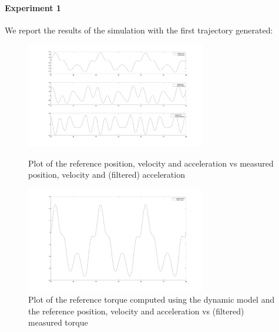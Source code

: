 \documentclass{article}
\begin{document}
\paragraph{Experiment 1}
We report the results of the simulation with the first trajectory generated:
\begin{figure}[!htbp]
\centering
\includegraphics[width=0.7\textwidth]{images/1-dof/new_experiment3_traj.png}
\caption{Plot of the reference position, velocity and acceleration vs measured position, velocity and (filtered) acceleration}
\includegraphics[width=0.7\textwidth]{images/1-dof/new_experiment3.png}
\caption{Plot of the reference torque computed using the dynamic model and the reference position, velocity and acceleration vs (filtered) measured torque}
\end{figure}
\pagebreak
\end{document}
